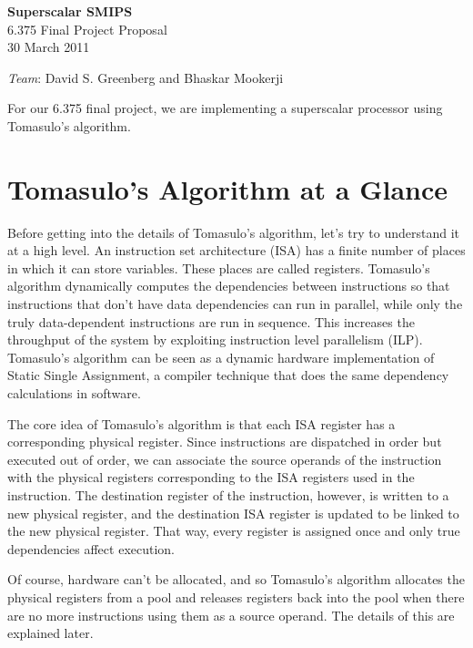 \documentclass[12pt]{article}
\begin{document}
  \begin{center}
    \textbf{\large Superscalar SMIPS} \\
    6.375 Final Project Proposal\\
    30 March 2011 \\
    
    \vspace{\baselineskip}
    
    \emph{Team}: David S. Greenberg and Bhaskar Mookerji
  \end{center}


For our 6.375 final project, we are implementing a superscalar processor using Tomasulo's algorithm.

\section{Tomasulo's Algorithm at a Glance}

Before getting into the details of Tomasulo's algorithm, let's try to understand it at a high level. An instruction set architecture (ISA) has a finite number of places in which
it can store variables. These places are called registers. Tomasulo's algorithm dynamically computes the dependencies between instructions so that instructions that
don't have data dependencies can run in parallel, while only the truly data-dependent instructions are run in sequence. This increases the throughput of the system by exploiting
instruction level parallelism (ILP). Tomasulo's algorithm can be seen as a dynamic hardware implementation of Static Single Assignment, a compiler technique that does
the same dependency calculations in software.

The core idea of Tomasulo's algorithm is that each ISA register has a corresponding physical register. Since instructions are dispatched in order but executed out of order,
we can associate the source operands of the instruction with the physical registers corresponding to the ISA registers used in the instruction. The destination register of
the instruction, however, is written to a new physical register, and the destination ISA register is updated to be linked to the new physical register. That way, every 
register is assigned once and only true dependencies affect execution.

Of course, hardware can't be allocated, and so Tomasulo's algorithm allocates the physical registers from a pool and releases registers back into the pool when there are
no more instructions using them as a source operand. The details of this are explained later.
\end{document}

